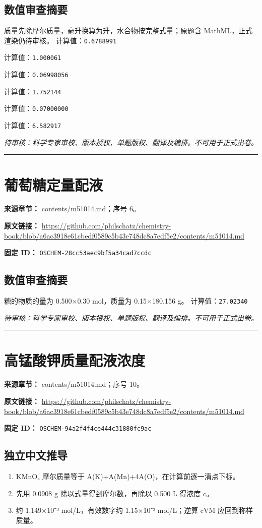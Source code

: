 \documentclass[UTF8,11pt,oneside,openany,fontset=none]{ctexbook}
\begin{document}
\subsection*{数值审查摘要}
质量先除摩尔质量，毫升换算为升，水合物按完整式量；原题含 MathML，正式渲染仍待审核。
\noindent 计算值：\texttt{0.6788991}\par
\noindent 计算值：\texttt{1.000061}\par
\noindent 计算值：\texttt{0.06998056}\par
\noindent 计算值：\texttt{1.752144}\par
\noindent 计算值：\texttt{0.07000000}\par
\noindent 计算值：\texttt{6.582917}\par
\noindent\textit{待审核：科学专家审校、版本授权、单题版权、翻译及编排。不可用于正式出卷。}
\medskip\hrule\medskip
\section{葡萄糖定量配液}
\noindent\textbf{来源章节：} contents/m51014.md；序号 6。\par
\noindent\textbf{原文链接：} \url{https://github.com/philschatz/chemistry-book/blob/a6ac3918e61cbedf0589c5b43e748dc8a7edf5e2/contents/m51014.md}\par
\noindent\textbf{固定 ID：} \texttt{OSCHEM-28cc53aec9bf5a34cad7ccdc}\par
\subsection*{数值审查摘要}
糖的物质的量为 0.500×0.30 mol，质量为 0.15×180.156 g。
\noindent 计算值：\texttt{27.02340}\par
\noindent\textit{待审核：科学专家审校、版本授权、单题版权、翻译及编排。不可用于正式出卷。}
\medskip\hrule\medskip
\section{高锰酸钾质量配液浓度}
\noindent\textbf{来源章节：} contents/m51014.md；序号 10。\par
\noindent\textbf{原文链接：} \url{https://github.com/philschatz/chemistry-book/blob/a6ac3918e61cbedf0589c5b43e748dc8a7edf5e2/contents/m51014.md}\par
\noindent\textbf{固定 ID：} \texttt{OSCHEM-94a2f4f4ce444c31880fc9ac}\par
\subsection*{独立中文推导}
\begin{enumerate}
\item KMnO₄ 摩尔质量等于 A(K)+A(Mn)+4A(O)，在计算前逐一清点下标。
\item 先用 0.0908 g 除以式量得到摩尔数，再除以 0.500 L 得浓度 c。
\item 约 1.149×10⁻³ mol/L，有效数字约 1.15×10⁻³ mol/L；逆算 cVM 应回到称样质量。
\end{enumerate}
\end{document}
